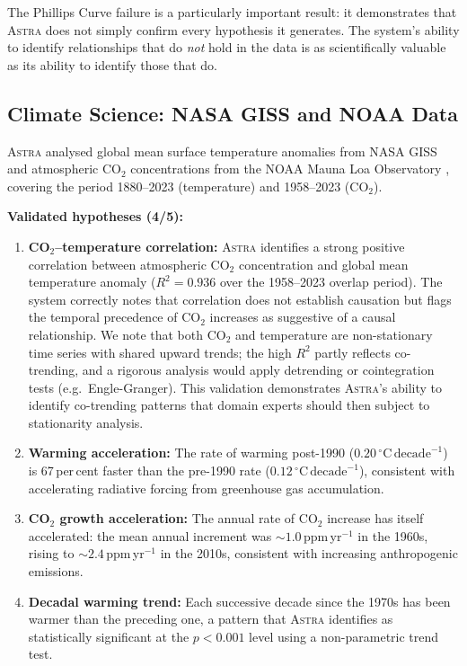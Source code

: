 \documentclass[usenatbib]{rasti}
\newcommand{\astra}{\textsc{Astra}\xspace}
\begin{document}
The Phillips Curve failure is a particularly important result: it demonstrates that \astra does not simply confirm every hypothesis it generates. The system's ability to identify relationships that do \emph{not} hold in the data is as scientifically valuable as its ability to identify those that do.

\subsection{Climate Science: NASA GISS and NOAA Data}
\label{sec:crossdomain:climate}

\astra analysed global mean surface temperature anomalies from NASA GISS \citep{Hansen2010} and atmospheric CO$_{2}$ concentrations from the NOAA Mauna Loa Observatory \citep{NOAA2024}, covering the period 1880--2023 (temperature) and 1958--2023 (CO$_{2}$).

\textbf{Validated hypotheses (4/5):}
\begin{enumerate}
  \item[(i)] \textbf{CO$_{2}$--temperature correlation:} \astra identifies a strong positive correlation between atmospheric CO$_{2}$ concentration and global mean temperature anomaly ($R^{2} = 0.936$ over the 1958--2023 overlap period). The system correctly notes that correlation does not establish causation but flags the temporal precedence of CO$_{2}$ increases as suggestive of a causal relationship. We note that both CO$_{2}$ and temperature are non-stationary time series with shared upward trends; the high $R^{2}$ partly reflects co-trending, and a rigorous analysis would apply detrending or cointegration tests (e.g.\ Engle-Granger). This validation demonstrates \astra's ability to identify co-trending patterns that domain experts should then subject to stationarity analysis.
  \item[(ii)] \textbf{Warming acceleration:} The rate of warming post-1990 ($0.20\,^{\circ}\mathrm{C}\,\mathrm{decade}^{-1}$) is 67\,per\,cent faster than the pre-1990 rate ($0.12\,^{\circ}\mathrm{C}\,\mathrm{decade}^{-1}$), consistent with accelerating radiative forcing from greenhouse gas accumulation.
  \item[(iii)] \textbf{CO$_{2}$ growth acceleration:} The annual rate of CO$_{2}$ increase has itself accelerated: the mean annual increment was ${\sim}1.0$\,ppm\,yr$^{-1}$ in the 1960s, rising to ${\sim}2.4$\,ppm\,yr$^{-1}$ in the 2010s, consistent with increasing anthropogenic emissions.
  \item[(iv)] \textbf{Decadal warming trend:} Each successive decade since the 1970s has been warmer than the preceding one, a pattern that \astra identifies as statistically significant at the $p < 0.001$ level using a non-parametric trend test.
\end{enumerate}
\end{document}

